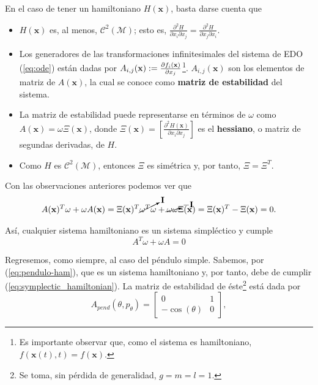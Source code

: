 En el caso de tener un hamiltoniano $H(\mathbf{x})$, basta darse cuenta que
\begin{itemize}
\item $H(\mathbf{x})$ es, al menos, $\mathcal{C}^2(\mathcal{M})$; esto es, $\frac{\partial^2 H}{\partial x_i \partial x_j} = \frac{\partial^2 H}{\partial x_j \partial x_i}$.

\item Los generadores de las transformaciones infinitesimales del sistema de EDO (\ref{eq:ode}) están dadas por $A_{i,j}(\mathbf{x}) := \frac{\partial f_i(\mathbf{x})}{\partial x_j}$\footnote{Es importante observar que, como el sistema es hamiltoniano, $f(\mathbf{x}(t),t) = f(\mathbf{x})$.}. $A_{i,j}(\mathbf{x})$ son los elementos de matriz de $A(\mathbf{x})$, la cual se conoce como \textbf{matriz de estabilidad} del sistema.

\item La matriz de estabilidad puede representarse en términos de $\omega$ como $A(\mathbf{x}) = \omega \Xi(\mathbf{x})$, donde $\Xi(\mathbf{x}) = \left[ \frac{\partial^2 H(\mathbf{x})}{\partial x_i \partial x_j} \right]$ es el \textbf{hessiano}, o matriz de segundas derivadas, de $H$.

\item Como $H$ es $\mathcal{C}^2(\mathcal{M})$, entonces $\Xi$ es simétrica y, por tanto, $\Xi = \Xi^T$.
\end{itemize}

Con las observaciones anteriores podemos ver que
\begin{align*}
 A(\mathbf{x})^T \omega + \omega A(\mathbf{x}) = \Xi(\mathbf{x})^T \cancelto{\mathbf{I}}{\omega^T \omega} + \cancelto{-\mathbf{I}}{\omega \omega}\Xi(\mathbf{x}) = \Xi(\mathbf{x})^T - \Xi(\mathbf{x}) = 0.
\end{align*}

Así, cualquier sistema hamiltoniano es un sistema simpléctico y cumple
\begin{equation}
 A^T\omega + \omega A = 0
 \label{eq:symplectic_hamiltonian}
\end{equation}


Regresemos, como siempre, al caso del péndulo simple. Sabemos, por (\ref{eq:pendulo-ham}), que es un sistema hamiltoniano y, por tanto, debe de cumplir (\ref{eq:symplectic_hamiltonian}). La matriz de estabilidad de éste\footnote{Se toma, sin pérdida de generalidad, $g = m = l = 1$.} está dada por
\begin{equation*}
  A_{pend}(\theta,p_\theta) =
  \begin{bmatrix}
    0             & 1 \\
    -\cos(\theta) & 0
  \end{bmatrix},
\end{equation*}

